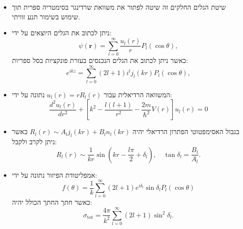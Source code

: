 \documentclass{tstextbook}
\begin{document}
\begin{summary}
  \begin{itemize}
    \item שיטת הגלים החלקים זה שיטה לפתור את משוואת שרדינגר בסימטריה ספרית תוך שימוש בשימור תנע זוויתי.
    \item ניתן לכתוב את הגלים היוצאים על ידי:
$$\psi(\mathbf{r})=\sum_{l=0}^{\infty}{\frac{u_{l}(r)}{r}}P_{l}(\cos\theta),$$
כאשר ניתן לכתוב את הגלים הנכנסים בעזרת פונקציות בסל ספריות:
$$e^{i k z}=\sum_{l=0}^{\infty}(2l+1)i^{l}j_{l}(k r)P_{l}(\cos\theta),$$
    \item המשוואה הרדיאלית עבור \(u_{l}(r)=rR_{l}(r)\) נתונה על ידי:
$$\frac{d^{2}u_{l}(r)}{d r^{2}}+\left[k^{2}-\frac{l(l+1)}{r^{2}}-\frac{2m}{\hbar^{2}}V(r)\right]u_{l}(r)=0$$
    \item בגבול האסימפטוטי הפתרון הרדיאלי יהיה \(R_{l}(r)\sim A_{l}j_{l}(k r)+B_{l}n_{l}(k r)\) כאשר ניתן לקרב ולקבל:
$$R_{l}(r)\sim\frac{1}{k r}\sin\left(k r-\frac{l\pi}{2}+\delta_{l}\right),\quad\tan\delta_{l}=\frac{B_{l}}{A_{l}}.$$
    \item אמפליטודת הפיזור נתונה על ידי:
$$f(\theta)=\frac{1}{k}\sum_{l=0}^{\infty}(2l+1)e^{i\delta_{l}}\sin\delta_{l}P_{l}(\cos\theta)$$
כאשר חתך החתך הכולל יהיה:
$$\sigma_{\mathrm{tot}}=\frac{4\pi}{k^{2}}\sum_{l=0}^{\infty}(2l+1)\sin^{2}\delta_{l}.$$
  \end{itemize}
\end{summary}
\end{document}

